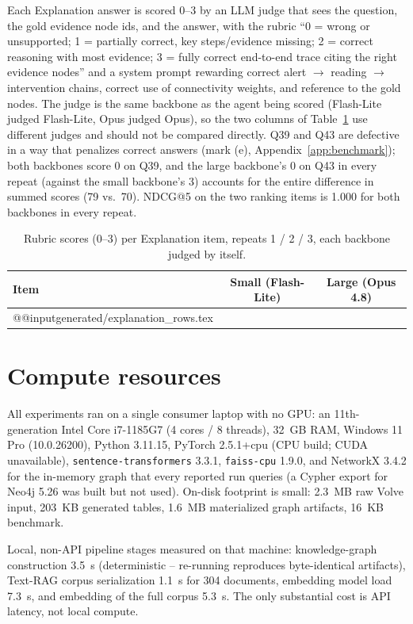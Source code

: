 \documentclass{article}
\begin{document}
Each Explanation answer is scored 0--3 by an LLM judge that sees the question,
the gold evidence node ids, and the answer, with the rubric ``0 = wrong or
unsupported; 1 = partially correct, key steps/evidence missing; 2 = correct
reasoning with most evidence; 3 = fully correct end-to-end trace citing the
right evidence nodes'' and a system prompt rewarding correct alert
$\to$ reading $\to$ intervention chains, correct use of connectivity weights,
and reference to the gold nodes. The judge is the same backbone as the agent
being scored (Flash-Lite judged Flash-Lite, Opus judged Opus), so the two
columns of Table~\ref{tab:rubric} use different judges and should not be
compared directly. Q39 and Q43 are defective in a way that penalizes correct
answers (mark (e), Appendix~\ref{app:benchmark}); both backbones score 0 on
Q39, and the large backbone's 0 on Q43 in every repeat (against the small
backbone's 3) accounts for the entire difference in summed scores (79 vs.\
70). NDCG@5 on the two ranking items is 1.000 for both backbones in every
repeat.

\begin{table}[h]
  \centering
  \small
  \caption{Rubric scores (0--3) per Explanation item, repeats 1 / 2 / 3, each
  backbone judged by itself.}
  \label{tab:rubric}
  \begin{tabular}{lcc}
    \toprule
    Item & Small (Flash-Lite) & Large (Opus 4.8) \\
    \midrule
\csname @@input\endcsname generated/explanation_rows.tex
    \bottomrule
  \end{tabular}
\end{table}

\section{Compute resources}
\label{app:compute}

All experiments ran on a single consumer laptop with no GPU: an 11th-generation
Intel Core i7-1185G7 (4 cores / 8 threads), 32~GB RAM, Windows 11 Pro
(10.0.26200), Python 3.11.15, PyTorch 2.5.1+cpu (CPU build; CUDA unavailable),
\texttt{sentence-transformers} 3.3.1, \texttt{faiss-cpu} 1.9.0, and NetworkX
3.4.2 for the in-memory graph that every reported run queries (a Cypher export
for Neo4j 5.26 was built but not used). On-disk footprint is small: 2.3~MB raw Volve
input, 203~KB generated tables, 1.6~MB materialized graph artifacts, 16~KB
benchmark.

Local, non-API pipeline stages measured on that machine: knowledge-graph
construction 3.5~s (deterministic -- re-running reproduces byte-identical
artifacts), Text-RAG corpus serialization 1.1~s for 304 documents, embedding
model load 7.3~s, and embedding of the full corpus 5.3~s. The only substantial
cost is API latency, not local compute.
\end{document}

